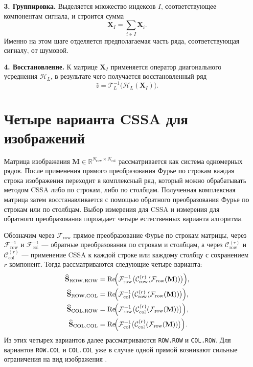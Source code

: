 \textbf{3. Группировка.}
Выделяется множество индексов $I$, соответствующее компонентам сигнала, и
строится сумма
\[
\mathbf{X}_I = \sum_{i\in I}\mathbf{X}_i.
\]
Именно на этом шаге отделяется предполагаемая часть ряда, соответствующая сигналу, от шумовой.

\textbf{4. Восстановление.}
К матрице $\mathbf{X}_I$ применяется оператор диагонального усреднения
$\mathcal{H}_L$, в результате чего получается восстановленный ряд
\[
\widehat{z} = \mathcal{T}_L^{-1}\bigl(\mathcal{H}_L(\mathbf{X}_I)\bigr).
\]

\section{Четыре варианта CSSA для изображений}

Матрица изображения
$\mathbf{M}\in\mathbb{R}^{N_{\mathrm{row}}\times N_{\mathrm{col}}}$
рассматривается как система одномерных рядов. После применения прямого
преобразования Фурье по строкам каждая строка изображения переходит в
комплексный ряд, который можно обрабатывать методом CSSA либо по строкам, либо
по столбцам. Полученная комплексная матрица затем восстанавливается с помощью
обратного преобразования Фурье по строкам или по столбцам. Выбор измерения для
CSSA и измерения для обратного преобразования порождает четыре естественных
варианта алгоритма.

Обозначим через $\mathcal{F}_{\mathrm{row}}$ прямое преобразование Фурье по
строкам матрицы, через $\mathcal{F}^{-1}_{\mathrm{row}}$ и
$\mathcal{F}^{-1}_{\mathrm{col}}$ --- обратные преобразования по строкам и
столбцам, а через $\mathcal{C}_{\mathrm{row}}^{(r)}$ и
$\mathcal{C}_{\mathrm{col}}^{(r)}$ --- применение CSSA к каждой строке или
каждому столбцу с сохранением $r$ компонент. Тогда рассматриваются следующие
четыре варианта:
\begin{align*}
\widehat{\mathbf{S}}_{\mathrm{ROW.ROW}}
&=
\operatorname{Re}\!\Bigl(
\mathcal{F}^{-1}_{\mathrm{row}}
\bigl(
\mathcal{C}_{\mathrm{row}}^{(r)}(\mathcal{F}_{\mathrm{row}}(\mathbf{M}))
\bigr)
\Bigr), \\
\widehat{\mathbf{S}}_{\mathrm{ROW.COL}}
&=
\operatorname{Re}\!\Bigl(
\mathcal{F}^{-1}_{\mathrm{col}}
\bigl(
\mathcal{C}_{\mathrm{row}}^{(r)}(\mathcal{F}_{\mathrm{row}}(\mathbf{M}))
\bigr)
\Bigr), \\
\widehat{\mathbf{S}}_{\mathrm{COL.ROW}}
&=
\operatorname{Re}\!\Bigl(
\mathcal{F}^{-1}_{\mathrm{row}}
\bigl(
\mathcal{C}_{\mathrm{col}}^{(r)}(\mathcal{F}_{\mathrm{row}}(\mathbf{M}))
\bigr)
\Bigr), \\
\widehat{\mathbf{S}}_{\mathrm{COL.COL}}
&=
\operatorname{Re}\!\Bigl(
\mathcal{F}^{-1}_{\mathrm{col}}
\bigl(
\mathcal{C}_{\mathrm{col}}^{(r)}(\mathcal{F}_{\mathrm{row}}(\mathbf{M}))
\bigr)
\Bigr).
\end{align*}
Из этих четырех вариантов далее рассматриваются \texttt{ROW.ROW} и
\texttt{COL.ROW}. Для вариантов \texttt{ROW.COL} и \texttt{COL.COL} уже в
случае одной прямой возникают сильные ограничения на вид изображения
\cite{zhornikova2016}.

